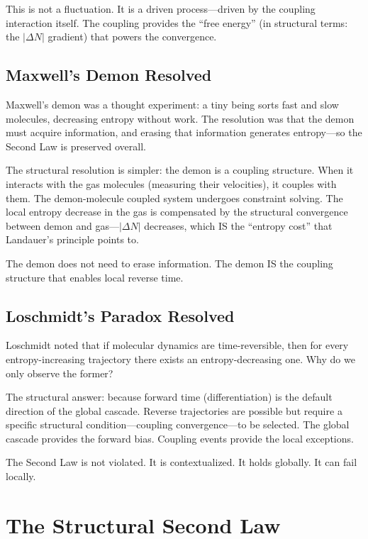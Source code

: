 \documentclass[12pt,a4paper]{article}
\begin{document}
This is not a fluctuation. It is a driven process---driven by the coupling interaction itself. The coupling provides the ``free energy'' (in structural terms: the $|\Delta N|$ gradient) that powers the convergence.

\subsection{Maxwell's Demon Resolved}

Maxwell's demon was a thought experiment: a tiny being sorts fast and slow molecules, decreasing entropy without work. The resolution was that the demon must acquire information, and erasing that information generates entropy---so the Second Law is preserved overall.

The structural resolution is simpler: the demon is a coupling structure. When it interacts with the gas molecules (measuring their velocities), it couples with them. The demon-molecule coupled system undergoes constraint solving. The local entropy decrease in the gas is compensated by the structural convergence between demon and gas---$|\Delta N|$ decreases, which IS the ``entropy cost'' that Landauer's principle points to.

The demon does not need to erase information. The demon IS the coupling structure that enables local reverse time.

\subsection{Loschmidt's Paradox Resolved}

Loschmidt noted that if molecular dynamics are time-reversible, then for every entropy-increasing trajectory there exists an entropy-decreasing one. Why do we only observe the former?

The structural answer: because forward time (differentiation) is the default direction of the global cascade. Reverse trajectories are possible but require a specific structural condition---coupling convergence---to be selected. The global cascade provides the forward bias. Coupling events provide the local exceptions.

The Second Law is not violated. It is contextualized. It holds globally. It can fail locally.

\section{The Structural Second Law}
\end{document}
